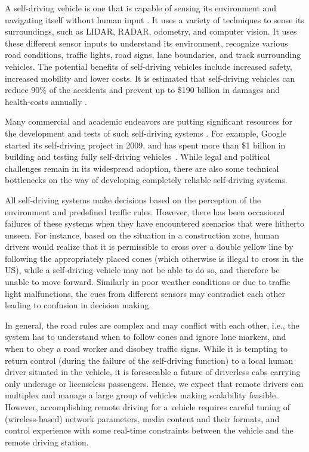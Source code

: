 
A self-driving vehicle is one that is capable of sensing 
its environment and navigating itself without human input \cite{wikiselfdrivingcar}. 
It uses a variety of techniques to sense its surroundings,
such as LIDAR, RADAR, odometry, and computer vision. 
It uses these different sensor inputs 
to understand its environment, 
recognize various road conditions, traffic lights, road signs,
lane boundaries, and track surrounding vehicles.
The potential benefits of self-driving vehicles
include increased safety, increased mobility and lower
costs. 
It is estimated that self-driving vehicles can reduce 90\%
of the accidents and prevent up to \$190 
billion in damages and health-costs annually
\cite{litman2014autonomous}.


Many commercial and academic endeavors are putting significant resources
for the development and tests
of such self-driving systems \cite{waymo, benz, autox}.
For example, Google started its self-driving project in 2009,  
and has spent more than \$1 billion
in building and testing fully self-driving vehicles~\cite{googlespend}. 
While legal and political challenges remain in its widespread adoption,
there are also some technical bottlenecks on the way of developing
completely reliable self-driving systems.


All self-driving systems make
decisions based on the perception of the environment and
predefined traffic rules. However, there has been occasional
failures of these systems when they have encountered scenarios
that were hitherto unseen. For instance, based on the situation
 in a construction
zone, human drivers would realize that it is permissible to cross
over a double yellow line by following the appropriately placed
cones  (which otherwise is illegal to cross
in the US), while a self-driving vehicle may not be able to
do so, and therefore be unable to move forward. Similarly in
poor weather conditions or due to traffic light malfunctions,  
the cues from different sensors may
contradict each other leading to confusion in decision making.

In general, the road rules are complex and may conflict with
each other, i.e., the system has to understand when
to follow cones and ignore lane markers, 
and when to obey a road worker and disobey traffic
signs.
While it is tempting to return control (during the failure of the self-driving
function) to a local human driver situated in the vehicle, 
it is foreseeable a future of driverless cabs carrying only
underage or licenseless passengers.
Hence, we expect that remote drivers can multiplex and manage
a large group of vehicles making scalability feasible.
However, accomplishing remote driving for a vehicle requires careful tuning 
of (wireless-based) network parameters, media content and their formats,
and control experience with some real-time constraints between the vehicle 
and the remote driving station.

